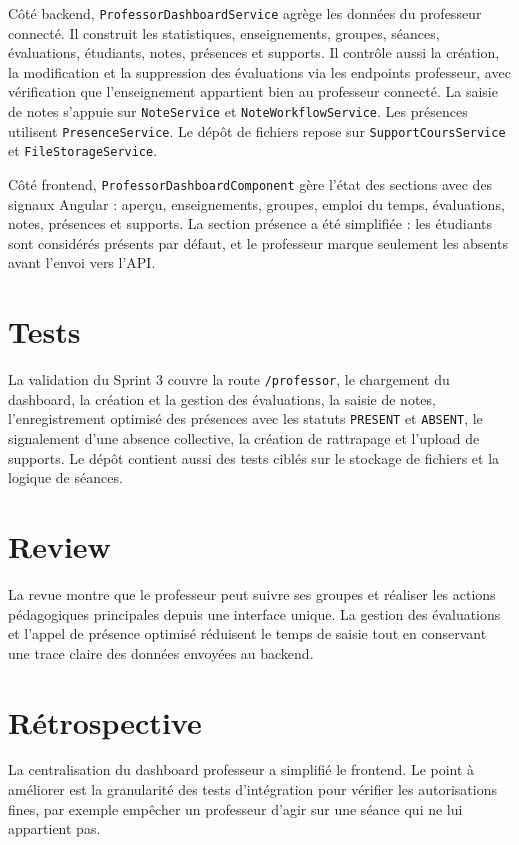 \documentclass[12pt,a4paper]{report}
\begin{document}
Côté backend, \texttt{ProfessorDashboardService} agrège les données du professeur connecté. Il construit les statistiques, enseignements, groupes, séances, évaluations, étudiants, notes, présences et supports. Il contrôle aussi la création, la modification et la suppression des évaluations via les endpoints professeur, avec vérification que l'enseignement appartient bien au professeur connecté. La saisie de notes s'appuie sur \texttt{NoteService} et \texttt{NoteWorkflowService}. Les présences utilisent \texttt{PresenceService}. Le dépôt de fichiers repose sur \texttt{SupportCoursService} et \texttt{FileStorageService}.

Côté frontend, \texttt{ProfessorDashboardComponent} gère l'état des sections avec des signaux Angular : aperçu, enseignements, groupes, emploi du temps, évaluations, notes, présences et supports. La section présence a été simplifiée : les étudiants sont considérés présents par défaut, et le professeur marque seulement les absents avant l'envoi vers l'API.

\section{Tests}

La validation du Sprint 3 couvre la route \texttt{/professor}, le chargement du dashboard, la création et la gestion des évaluations, la saisie de notes, l'enregistrement optimisé des présences avec les statuts \texttt{PRESENT} et \texttt{ABSENT}, le signalement d'une absence collective, la création de rattrapage et l'upload de supports. Le dépôt contient aussi des tests ciblés sur le stockage de fichiers et la logique de séances.

\section{Review}

La revue montre que le professeur peut suivre ses groupes et réaliser les actions pédagogiques principales depuis une interface unique. La gestion des évaluations et l'appel de présence optimisé réduisent le temps de saisie tout en conservant une trace claire des données envoyées au backend.

\section{Rétrospective}

La centralisation du dashboard professeur a simplifié le frontend. Le point à améliorer est la granularité des tests d'intégration pour vérifier les autorisations fines, par exemple empêcher un professeur d'agir sur une séance qui ne lui appartient pas.
\end{document}
